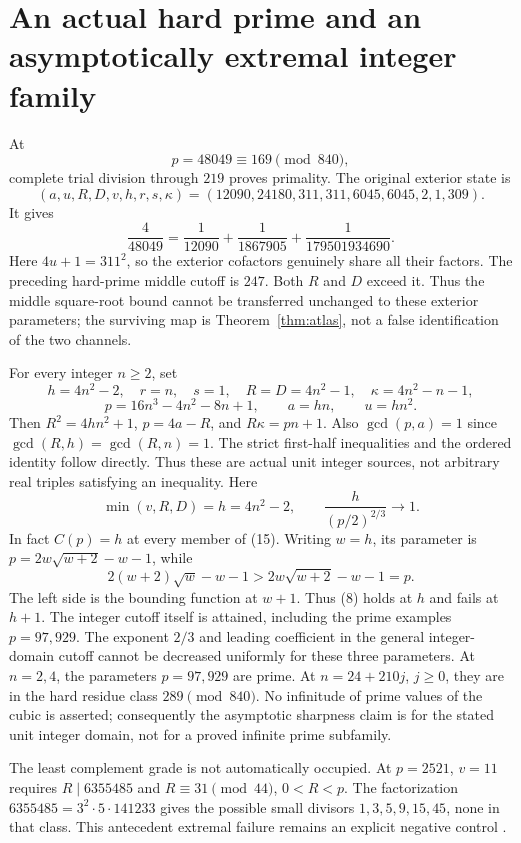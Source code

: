 \section{An actual hard prime and an asymptotically extremal integer family}
At
\[
 \boxed{p=48049\equiv169\pmod{840}},
\]
complete trial division through $219$ proves primality. The original exterior
state is
\[
 \boxed{(a,u,R,D,v,h,r,s,\kappa)
 =(12090,24180,311,311,6045,6045,2,1,309).}                \tag{14}
\]
It gives
\[
 \boxed{\frac4{48049}=\frac1{12090}+\frac1{1867905}
 +\frac1{179501934690}.}
\]
Here $4u+1=311^2$, so the exterior cofactors genuinely share all their factors.
The preceding hard-prime middle cutoff is $247$. Both $R$ and $D$ exceed it.
Thus the middle square-root bound cannot be transferred unchanged to these
exterior parameters; the surviving map is Theorem~\ref{thm:atlas}, not a false
identification of the two channels.

For every integer $n\ge2$, set
\[
 h=4n^2-2,\quad r=n,\quad s=1,\quad
 R=D=4n^2-1,\quad\kappa=4n^2-n-1,
\]
\[
 p=16n^3-4n^2-8n+1,\qquad a=hn,\qquad u=hn^2.
                                                               \tag{15}
\]
Then $R^2=4hn^2+1$, $p=4a-R$, and $R\kappa=pn+1$.
Also $\gcd(p,a)=1$ since $\gcd(R,h)=\gcd(R,n)=1$.
The strict first-half inequalities and the ordered identity follow directly.
Thus these are actual unit integer sources, not arbitrary real triples satisfying
an inequality. Here
\[
 \min(v,R,D)=h=4n^2-2,
 \qquad \frac{h}{(p/2)^{2/3}}\longrightarrow1.
\]
In fact $C(p)=h$ at every member of (15). Writing $w=h$, its parameter is
$p=2w\sqrt{w+2}-w-1$, while
\[
 2(w+2)\sqrt w-w-1>2w\sqrt{w+2}-w-1=p.
\]
The left side is the bounding function at $w+1$. Thus (8) holds at $h$ and fails
at $h+1$. The integer cutoff itself is attained, including the prime examples
$p=97,929$.
The exponent $2/3$ and leading coefficient in the general integer-domain cutoff
cannot be decreased uniformly for these three parameters. At $n=2,4$, the
parameters $p=97,929$ are prime. At $n=24+210j$, $j\ge0$, they are in the hard
residue class $289\pmod{840}$. No infinitude of prime values of the cubic is
asserted; consequently the asymptotic sharpness claim is for the stated unit
integer domain, not for a proved infinite prime subfamily.

The least complement grade is not automatically occupied. At $p=2521$, $v=11$
requires $R\mid6355485$ and $R\equiv31\pmod{44}$, $0<R<p$.
The factorization $6355485=3^2\cdot5\cdot141233$ gives the possible small divisors
$1,3,5,9,15,45$, none in that class. This antecedent extremal failure remains
an explicit negative control \cite{Localization}.

